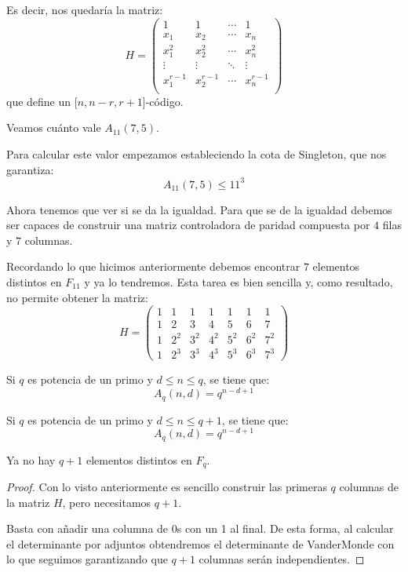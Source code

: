 Es decir, nos quedaría la matriz:
\[H=\left( \begin{array}{cccc}
1 & 1 & \cdots & 1 \\
x_1 & x_2 & \cdots & x_n \\
x_1^2 & x_2^2 & \cdots & x_n^2 \\
\vdots & \vdots & \ddots & \vdots \\
x_1^{r-1} & x_2^{r-1} & \cdots & x_n^{r-1} \\
\end{array}\right)\]
que define un [$n,n-r,r+1$]-código.

\begin{example}
Veamos cuánto vale $A_{11}(7,5)$.

Para calcular este valor empezamos estableciendo la cota de Singleton, que nos garantiza:
\[A_{11}(7,5) \leq 11^3\]

Ahora tenemos que ver si se da la igualdad. Para que se de la igualdad debemos ser capaces de construir una matriz controladora de paridad compuesta por $4$ filas y $7$ columnas.

Recordando lo que hicimos anteriormente debemos encontrar $7$ elementos distintos en $F_{11}$ y ya lo tendremos. Esta tarea es bien sencilla y, como resultado, no permite obtener la matriz:
\[H=\left( \begin{array}{ccccccc}
1 & 1 & 1 & 1 & 1 & 1 & 1 \\
1 & 2 & 3 & 4 & 5 & 6 & 7 \\
1 & 2^2 & 3^2 & 4^2 & 5^2 & 6^2 & 7^2 \\
1 & 2^3 & 3^3 & 4^3 & 5^3 & 6^3 & 7^3
\end{array}\right)\]
\end{example}

\begin{theorem}
Si $q$ es potencia de un primo y $d \leq n \leq q$, se tiene que:
\[A_q(n,d)=q^{n-d+1}\]
\end{theorem}

\begin{theorem}
Si $q$ es potencia de un primo y $d \leq n \leq q+1$, se tiene que:
\[A_q(n,d)=q^{n-d+1}\]
\end{theorem}

\obs Ya no hay $q+1$ elementos distintos en $F_q$.

\begin{proof}
Con lo visto anteriormente es sencillo construir las primeras $q$ columnas de la matriz $H$, pero necesitamos $q+1$.

Basta con añadir una columna de 0s con un 1 al final. De esta forma, al calcular el determinante por adjuntos obtendremos el determinante de VanderMonde con lo que seguimos garantizando que $q+1$ columnas serán independientes.
\end{proof}

